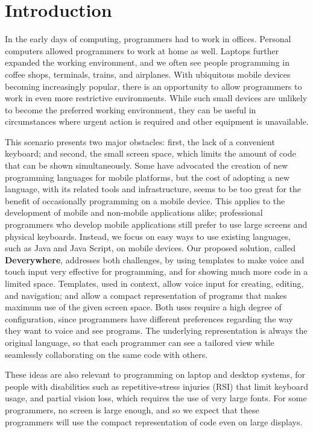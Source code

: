 \chapter{Introduction}
In the early days of computing, programmers had to work in offices. Personal computers allowed programmers to work at home as well. Laptops further expanded the working environment, and we often see people programming in coffee shops, terminals, trains, and airplanes. With ubiquitous mobile devices becoming increasingly popular, there is an opportunity to allow programmers to work in even more restrictive environments. While such small devices are unlikely to become the preferred working environment, they can be useful in circumstances where urgent action is required and other equipment is unavailable.

This scenario presents two major obstacles: first, the lack of a convenient keyboard; and second, the small screen space, which limits the amount of code that can be shown simultaneously. Some have advocated the creation of new programming languages for mobile platforms, but the cost of adopting a new language, with its related tools and infrastructure, seems to be too great for the benefit of occasionally programming on a mobile device. This applies to the development of mobile and non-mobile applications alike; professional programmers who develop mobile applications still prefer to use large screens and physical keyboards. Instead, we focus on easy ways to use existing languages, such as Java and Java Script, on mobile devices. Our proposed solution, called \textbf{Deverywhere}, addresses both challenges, by using templates to make voice and touch input very effective for programming, and for showing much more code in a limited space. Templates, used in context, allow voice input for creating, editing, and navigation; and allow a compact representation of programs that makes maximum use of the given screen space. Both uses require a high degree of configuration, since programmers have different preferences regarding the way they want to voice and see programs. The underlying representation is always the original language, so that each programmer can see a tailored view while seamlessly collaborating on the same code with others.

These ideas are also relevant to programming on laptop and desktop systems, for people with disabilities such as repetitive-stress injuries (RSI) that limit keyboard usage, and partial vision loss, which requires the use of very large fonts. For some programmers, no screen is large enough, and so we expect that these programmers will use the compact representation of code even on large displays.

